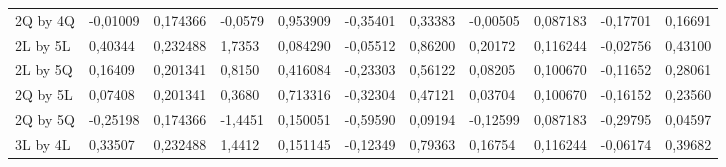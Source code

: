 \begin{table}[]
{\begin{tabular}{lllllllllll}
\rowcolor[HTML]{FFFFFF} 
2Q by 4Q                              & {\color[HTML]{181A1B} -0,01009} & {\color[HTML]{181A1B} 0,174366} & {\color[HTML]{181A1B} -0,0579}  & {\color[HTML]{181A1B} 0,953909} & {\color[HTML]{181A1B} -0,35401}       & {\color[HTML]{181A1B} 0,33383}        & {\color[HTML]{181A1B} -0,00505} & {\color[HTML]{181A1B} 0,087183}      & {\color[HTML]{181A1B} -0,17701}       & {\color[HTML]{181A1B} 0,16691}        \\
\rowcolor[HTML]{FFFFFF} 
2L by 5L                              & {\color[HTML]{181A1B} 0,40344}  & {\color[HTML]{181A1B} 0,232488} & {\color[HTML]{181A1B} 1,7353}   & {\color[HTML]{181A1B} 0,084290} & {\color[HTML]{181A1B} -0,05512}       & {\color[HTML]{181A1B} 0,86200}        & {\color[HTML]{181A1B} 0,20172}  & {\color[HTML]{181A1B} 0,116244}      & {\color[HTML]{181A1B} -0,02756}       & {\color[HTML]{181A1B} 0,43100}        \\
\rowcolor[HTML]{FFFFFF} 
2L by 5Q                              & {\color[HTML]{181A1B} 0,16409}  & {\color[HTML]{181A1B} 0,201341} & {\color[HTML]{181A1B} 0,8150}   & {\color[HTML]{181A1B} 0,416084} & {\color[HTML]{181A1B} -0,23303}       & {\color[HTML]{181A1B} 0,56122}        & {\color[HTML]{181A1B} 0,08205}  & {\color[HTML]{181A1B} 0,100670}      & {\color[HTML]{181A1B} -0,11652}       & {\color[HTML]{181A1B} 0,28061}        \\
\rowcolor[HTML]{FFFFFF} 
2Q by 5L                              & {\color[HTML]{181A1B} 0,07408}  & {\color[HTML]{181A1B} 0,201341} & {\color[HTML]{181A1B} 0,3680}   & {\color[HTML]{181A1B} 0,713316} & {\color[HTML]{181A1B} -0,32304}       & {\color[HTML]{181A1B} 0,47121}        & {\color[HTML]{181A1B} 0,03704}  & {\color[HTML]{181A1B} 0,100670}      & {\color[HTML]{181A1B} -0,16152}       & {\color[HTML]{181A1B} 0,23560}        \\
\rowcolor[HTML]{FFFFFF} 
2Q by 5Q                              & {\color[HTML]{181A1B} -0,25198} & {\color[HTML]{181A1B} 0,174366} & {\color[HTML]{181A1B} -1,4451}  & {\color[HTML]{181A1B} 0,150051} & {\color[HTML]{181A1B} -0,59590}       & {\color[HTML]{181A1B} 0,09194}        & {\color[HTML]{181A1B} -0,12599} & {\color[HTML]{181A1B} 0,087183}      & {\color[HTML]{181A1B} -0,29795}       & {\color[HTML]{181A1B} 0,04597}        \\
\rowcolor[HTML]{FFFFFF} 
3L by 4L                              & {\color[HTML]{181A1B} 0,33507}  & {\color[HTML]{181A1B} 0,232488} & {\color[HTML]{181A1B} 1,4412}   & {\color[HTML]{181A1B} 0,151145} & {\color[HTML]{181A1B} -0,12349}       & {\color[HTML]{181A1B} 0,79363}        & {\color[HTML]{181A1B} 0,16754}  & {\color[HTML]{181A1B} 0,116244}      & {\color[HTML]{181A1B} -0,06174}       & {\color[HTML]{181A1B} 0,39682}        \\

\end{tabular}}
\end{table}
